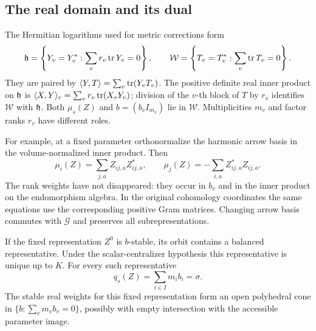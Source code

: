 \subsection{The real domain and its dual}
The Hermitian logarithms used for metric corrections form
\begin{equation}\label{eq:realspaces}
\mathfrak h=\left\{Y_v=Y_v^*: \sum_vr_v\operatorname{tr} Y_v=0\right\},\qquad
\mathcal W=\left\{T_v=T_v^*: \sum_v\operatorname{tr} T_v=0\right\}.
\end{equation}
They are paired by $\langle Y,T\rangle=\sum_v\operatorname{tr}(Y_vT_v)$.
The positive definite real inner product on $\mathfrak h$ is
$\langle X,Y\rangle_r=\sum_vr_v\operatorname{tr}(X_vY_v)$; division of the
$v$-th block of $T$ by $r_v$ identifies $\mathcal W$ with $\mathfrak h$.
Both $\mu_s(Z)$ and $b=(b_vI_{m_v})$ lie in $\mathcal W$.
Multiplicities $m_v$ and factor ranks $r_v$ have different roles.

For example, at a fixed parameter orthonormalize the harmonic arrow
basis in the volume-normalized inner product. Then
\begin{equation}\label{eq:momentcomponents}
\mu_i(Z)=\sum_{j,a}Z_{ij,a}Z_{ij,a}^*,\qquad
\mu_j(Z)=-\sum_{i,a}Z_{ij,a}^*Z_{ij,a}.
\end{equation}
The rank weights have not disappeared: they occur in $b_v$ and in the
inner product on the endomorphism algebra. In the original cohomology
coordinates the same equations use the corresponding positive Gram
matrices. Changing arrow basis commutes with $\mathcal G$ and preserves
all subrepresentations.

\begin{proposition}\label{prop:balance}
If the fixed representation $Z^0$ is $b$-stable, its orbit contains a
balanced representative. Under the scalar-centralizer hypothesis this
representative is unique up to $K$. For every such representative
\begin{equation}\label{eq:amplitude}
q_s(Z)=\sum_{i\in I}m_ib_i=\sigma.
\end{equation}
The stable real weights for this fixed representation form an open
polyhedral cone in $\{b:\sum_vm_vb_v=0\}$, possibly with empty
intersection with the accessible parameter image.
\end{proposition}

